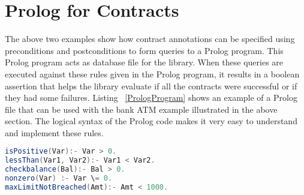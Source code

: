 \section{Prolog for Contracts}
The above two examples show how contract annotations can be specified using  preconditions and postconditions to form queries to a Prolog program. This Prolog program acts as database file for the library. When these queries are executed against these rules given in the Prolog program, it results in a boolean assertion that helps the library evaluate if all the contracts were successful or if they had some failures.   
Listing ~\ref{PrologProgram} shows an example of a Prolog file that can be used with the bank ATM example illustrated in the above section. The logical syntax of the Prolog code makes it very easy to understand and implement these rules.\linebreak


\begin{minipage}{\linewidth}
\begin{lstlisting}[frame=single, language=Java, caption={Prolog File with Contract Rules}, label={PrologProgram}, captionpos=b, breaklines=true]
isPositive(Var):- Var > 0.
lessThan(Var1, Var2):- Var1 < Var2.
checkbalance(Bal):- Bal > 0.
nonzero(Var) :- Var \= 0.
maxLimitNotBreached(Amt):- Amt < 1000.
\end{lstlisting}
\end{minipage} 